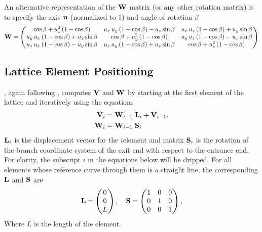 An alternative representation of the ${\bf W}$ matrix (or any other rotation matrix) is to specify the
axis ${\bf u}$ (normalized to 1) and angle of rotation $\beta$
\begin{equation}
  {\bf W} = \begin{pmatrix}
    \cos \beta + u_x^2 \left(1 - \cos \beta \right) & 
    u_x \, u_y \left(1 - \cos \beta \right) - u_z \sin \beta & 
    u_x \, u_z \left(1 - \cos \beta \right) + u_y \sin \beta \\ 
    u_y \, u_x \left(1 - \cos \beta \right) + u_z \sin \beta & 
    \cos \beta + u_y^2\left(1 - \cos \beta \right) & 
    u_y \, u_z \left(1 - \cos \beta \right) - u_x \sin \beta \\ 
    u_z \, u_x \left(1 - \cos \beta \right) - u_y \sin \beta & 
    u_z \, u_y \left(1 - \cos \beta \right) + u_x \sin \beta & 
    \cos \beta + u_z^2\left(1 - \cos \beta \right)
  \end{pmatrix}
  \label{wctux2}
\end{equation}

\subsection{Lattice Element Positioning}
\label{s:ele.pos}

\accellat, again following \mad, computes ${\bf V}$ and ${\bf W}$ by starting at the first element of the
lattice and iteratively using the equations
\begin{align}
  {\bf V}_i &= {\bf W}_{i-1} \; {\bf L}_i + {\bf V}_{i-1}, 
    \label{vwlv} \\
  {\bf W}_i &= {\bf W}_{i-1} \; {\bf S}_i
    \label{wws}
\end{align}
${\bf L}_i$ is the displacement vector for the $i$\Th element and matrix ${\bf S}_i$ is the rotation of
the branch coordinate system of the exit end with respect to the entrance end. For clarity, the
subscript $i$ in the equations below will be dripped. For all elements whose reference curve through
them is a straight line, the corresponding ${\bf L}$ and ${\bf S}$ are
\begin{equation}
  {\bf L} = 
  \begin{pmatrix}
      0 \\ 0 \\ L
  \end{pmatrix},
  \quad
  {\bf S} = 
  \begin{pmatrix}
      1 & 0 & 0 \\ 
      0 & 1 & 0 \\
      0 & 0 & 1
  \end{pmatrix},
  \label{l00l}
\end{equation}
Where $L$ is the length of the element. 

